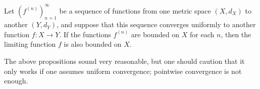 \begin{proposition}\label{3.3.6}
    Let \((f^{(n)})_{n = 1}^\infty\) be a sequence of functions from one metric space \((X, d_X)\) to another \((Y, d_Y)\), and suppose that this sequence converges uniformly to another function \(f : X \to Y\).
    If the functions \(f^{(n)}\) are bounded on \(X\) for each \(n\), then the limiting function \(f\) is also bounded on \(X\).
\end{proposition}

\begin{remark}\label{3.3.7}
    The above propositions sound very reasonable, but one should caution that it only works if one assumes uniform convergence;
    pointwise convergence is not enough.
\end{remark}
